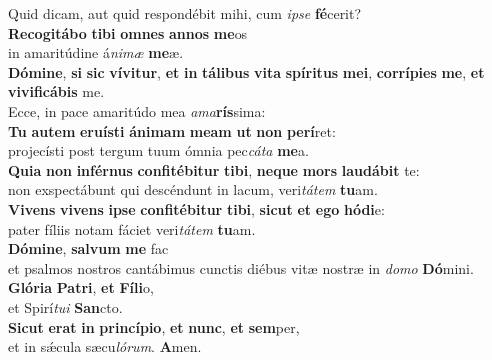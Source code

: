\oddverse Quid dicam, aut quid respondébit mihi, cum \textit{i}\textit{pse} \textbf{fé}cerit?\\
\evenverse \textbf{Re}\textbf{co}\textbf{gi}\textbf{tá}\textbf{bo} \textbf{ti}\textbf{bi} \textbf{om}\textbf{nes} \textbf{an}\textbf{nos} \textbf{me}os~\*\\
\evenverse in amaritúdine á\textit{ni}\textit{mæ} \textbf{me}æ.\\
\oddverse \textbf{Dó}\textbf{mi}\textbf{ne}, \textbf{si} \textbf{sic} \textbf{ví}\textbf{vi}\textbf{tur}, \textbf{et} \textbf{in} \textbf{tá}\textbf{li}\textbf{bus} \textbf{vi}\textbf{ta} \textbf{spí}\textbf{ri}\textbf{tus} \textbf{me}\textbf{i}, \textbf{cor}\textbf{rí}\textbf{pi}\textbf{es} \textbf{me}, \textbf{et} \textbf{vi}\textbf{vi}\textbf{fi}\textbf{cá}\textbf{bis} me.~\*\\
\oddverse Ecce, in pace amaritúdo mea \textit{a}\textit{ma}\textbf{rís}sima:\\
\evenverse \textbf{Tu} \textbf{au}\textbf{tem} \textbf{e}\textbf{ru}\textbf{í}\textbf{sti} \textbf{á}\textbf{ni}\textbf{mam} \textbf{me}\textbf{am} \textbf{ut} \textbf{non} \textbf{pe}\textbf{rí}ret:~\*\\
\evenverse projecísti post tergum tuum ómnia pec\textit{cá}\textit{ta} \textbf{me}a.\\
\oddverse \textbf{Qui}\textbf{a} \textbf{non} \textbf{in}\textbf{fér}\textbf{nus} \textbf{con}\textbf{fi}\textbf{té}\textbf{bi}\textbf{tur} \textbf{ti}\textbf{bi}, \textbf{ne}\textbf{que} \textbf{mors} \textbf{lau}\textbf{dá}\textbf{bit} te:~\*\\
\oddverse non exspectábunt qui descéndunt in lacum, veri\textit{tá}\textit{tem} \textbf{tu}am.\\
\evenverse \textbf{Vi}\textbf{vens} \textbf{vi}\textbf{vens} \textbf{i}\textbf{pse} \textbf{con}\textbf{fi}\textbf{té}\textbf{bi}\textbf{tur} \textbf{ti}\textbf{bi}, \textbf{si}\textbf{cut} \textbf{et} \textbf{e}\textbf{go} \textbf{hó}\textbf{di}e:~\*\\
\evenverse pater fíliis notam fáciet veri\textit{tá}\textit{tem} \textbf{tu}am.\\
\oddverse \textbf{Dó}\textbf{mi}\textbf{ne}, \textbf{sal}\textbf{vum} \textbf{me} fac~\*\\
\oddverse et psalmos nostros cantábimus cunctis diébus vitæ nostræ in \textit{do}\textit{mo} \textbf{Dó}mini.\\
\evenverse \textbf{Gló}\textbf{ri}\textbf{a} \textbf{Pa}\textbf{tri}, \textbf{et} \textbf{Fí}\textbf{li}o,~\*\\
\evenverse et Spirí\textit{tu}\textit{i} \textbf{San}cto.\\
\oddverse \textbf{Si}\textbf{cut} \textbf{e}\textbf{rat} \textbf{in} \textbf{prin}\textbf{cí}\textbf{pi}\textbf{o}, \textbf{et} \textbf{nunc}, \textbf{et} \textbf{sem}per,~\*\\
\oddverse et in sǽcula sæcu\textit{ló}\textit{rum}. \textbf{A}men.\\
